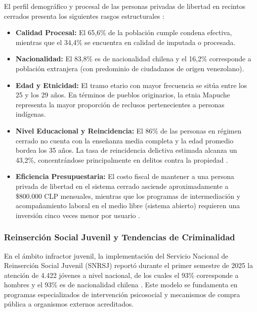El perfil demográfico y procesal de las personas privadas de libertad en recintos cerrados presenta los siguientes rasgos estructurales \parencite{CaracterizacionPersonasPrivadas2026}:
\begin{itemize}
    \item \textbf{Calidad Procesal:} El 65,6\% de la población cumple condena efectiva, mientras que el 34,4\% se encuentra en calidad de imputada o procesada.
    \item \textbf{Nacionalidad:} El 83,8\% es de nacionalidad chilena y el 16,2\% corresponde a población extranjera (con predominio de ciudadanos de origen venezolano).
    \item \textbf{Edad y Etnicidad:} El tramo etario con mayor frecuencia se sitúa entre los 25 y los 29 años. En términos de pueblos originarios, la etnia Mapuche representa la mayor proporción de reclusos pertenecientes a personas indígenas.
    \item \textbf{Nivel Educacional y Reincidencia:} El 86\% de las personas en régimen cerrado no cuenta con la enseñanza media completa y la edad promedio bordea los 35 años. La tasa de reincidencia delictiva estimada alcanza un 43,2\%, concentrándose principalmente en delitos contra la propiedad \parencite{CompendiosEstadisticos2026}.
    \item \textbf{Eficiencia Presupuestaria:} El costo fiscal de mantener a una persona privada de libertad en el sistema cerrado asciende aproximadamente a \$800.000 CLP mensuales, mientras que los programas de intermediación y acompañamiento laboral en el medio libre (sistema abierto) requieren una inversión cinco veces menor por usuario \parencite{CompendiosEstadisticos2026}.
\end{itemize}

\subsubsection{Reinserción Social Juvenil y Tendencias de Criminalidad}
En el ámbito infractor juvenil, la implementación del Servicio Nacional de Reinserción Social Juvenil (SNRSJ) reportó durante el primer semestre de 2025 la atención de 4.422 jóvenes a nivel nacional, de los cuales el 93\% corresponde a hombres y el 93\% es de nacionalidad chilena \parencite{Ley21527CreaElServicioNacionalDeReinsercionJuvenil}. Este modelo se fundamenta en programas especializados de intervención psicosocial y mecanismos de compra pública a organismos externos acreditados.

